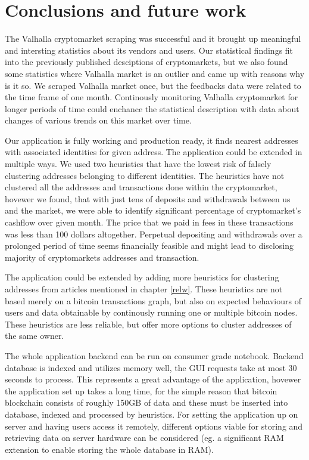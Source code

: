 \documentclass[
  digital, %
  table,   %
  lof,     %
  lot,     %
  oneside
]{fithesis3}
\begin{document}
\chapter{Conclusions and future work}

The Valhalla cryptomarket scraping was successful and
it brought up meaningful and intersting statistics about its vendors and users.
Our statistical findings fit into the previously published desciptions
of cryptomarkets, but we also found some statistics where Valhalla market is an outlier and
came up with reasons why is it so.
We scraped Valhalla market once, but the feedbacks data were
related to the time frame of one month. Continously monitoring 
Valhalla cryptomarket for longer periods of time could enchance the statistical description
with data about changes of various trends on this market over time.

Our application is fully working and production ready, it 
finds nearest addresses with associated identities for given address.
The application could be extended in multiple ways. We used two
heuristics that have the lowest risk of falsely clustering addresses belonging to different identities.
The heuristics have not clustered all the addresses and transactions done within the cryptomarket,
hovewer we found, that with just tens of deposits and withdrawals between us and the market,
we were able to identify significant percentage of cryptomarket's cashflow over given month.
The price that we paid in fees in these transactions was less than 100 dollars altogether. 
Perpetual depositing and withdrawals over a prolonged period of time seems financially feasible
and might lead to disclosing majority of cryptomarkets addresses and transaction.

The application could be extended by adding more heuristics for clustering addresses from articles mentioned
in chapter \ref{relw}.
These heuristics are not based merely on a bitcoin transactions graph, but also
on expected behaviours of users and data obtainable by continously running one or multiple
bitcoin nodes. These heuristics are less reliable, but offer more options to cluster addresses of the same owner.

The whole application backend can be run on consumer grade notebook. Backend database is indexed and utilizes memory well,
the GUI requests take at most 30 seconds to process. This represents a great advantage of the application,
hovewer the application set up takes a long time, for the simple reason that bitcoin
blockchain consists of roughly 150GB of data and these must be inserted into database, indexed
and processed by heuristics.
For setting the application up on server and having users access it remotely,
different options viable for storing and retrieving data on server hardware
can be considered (eg. a significant RAM extension to enable storing the whole database in RAM). 

\printbibliography{}
\end{document}
